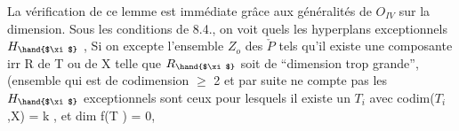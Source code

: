 La vérification de ce lemme est immédiate grâce aux généralités
de $O_{IV}$ sur la dimension. Sous les conditions de 8.4., on voit  quels 
les hyperplans exceptionnels $H_{\hand{$\xi$}}$ 
, Si
on excepte l'ensemble $Z_o$ des \hand{$\xi\in$} $\check{P}$ tels qu'il existe une composante
irr R de T ou de X telle  que $R_{\hand{$\xi$}}$ soit de ``dimension trop grande'',
 (ensemble qui est de codimension $\geq$ 2 et par suite ne compte pas
les $H_{\hand{$\xi$}}$  exceptionnels sont ceux pour lesquels il existe
un $T_i$ avec codim($T_i$,X) = k , et  dim f(T ) = 0,

